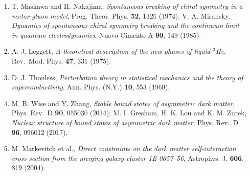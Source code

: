 \documentclass[
  10pt,
]{article}
\begin{document}
\begin{enumerate}
  L. Dolan and R. Jackiw, \emph{Symmetry behavior at finite
  temperature}, Phys. Rev.~D \textbf{9}, 3320 (1974).
\item
  T. Maskawa and H. Nakajima, \emph{Spontaneous breaking of chiral
  symmetry in a vector-gluon model}, Prog. Theor. Phys. \textbf{52},
  1326 (1974); V. A. Miransky, \emph{Dynamics of spontaneous chiral
  symmetry breaking and the continuum limit in quantum electrodynamics},
  Nuovo Cimento A \textbf{90}, 149 (1985).
\item
  A. J. Leggett, \emph{A theoretical description of the new phases of
  liquid \(^3\)He}, Rev.~Mod. Phys. \textbf{47}, 331 (1975).
\item
  D. J. Thouless, \emph{Perturbation theory in statistical mechanics and
  the theory of superconductivity}, Ann. Phys. (N.Y.) \textbf{10}, 553
  (1960).
\item
  M. B. Wise and Y. Zhang, \emph{Stable bound states of asymmetric dark
  matter}, Phys. Rev.~D \textbf{90}, 055030 (2014); M. I. Gresham, H. K.
  Lou and K. M. Zurek, \emph{Nuclear structure of bound states of
  asymmetric dark matter}, Phys. Rev.~D \textbf{96}, 096012 (2017).
\item
  M. Markevitch et al., \emph{Direct constraints on the dark matter
  self-interaction cross section from the merging galaxy cluster 1E
  0657--56}, Astrophys. J. \textbf{606}, 819 (2004).
\end{enumerate}
\end{document}
